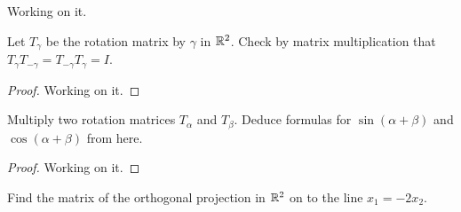 \begin{exercise}
  Working on it.
\end{exercise}
\begin{exercise}
  Let $T_{\gamma}$ be the rotation matrix by $\gamma$ in $\mathbb{R}^2$.
  Check by matrix multiplication that 
  $T_{\gamma}T_{-\gamma}=T_{-\gamma}T_{\gamma}=I$.
\end{exercise}
\begin{proof}
  Working on it.
\end{proof}
\begin{exercise}
  Multiply two rotation matrices $T_{\alpha}$ and $T_{\beta}$. Deduce
  formulas for $\sin(\alpha+\beta)$ and $\cos(\alpha+\beta)$
  from here.
\end{exercise}
\begin{proof}
  Working on it.
\end{proof}
\begin{exercise}
  Find the matrix of the orthogonal projection in $\mathbb{R}^2$ on to the line
  $x_1=-2x_2$.
\end{exercise}
